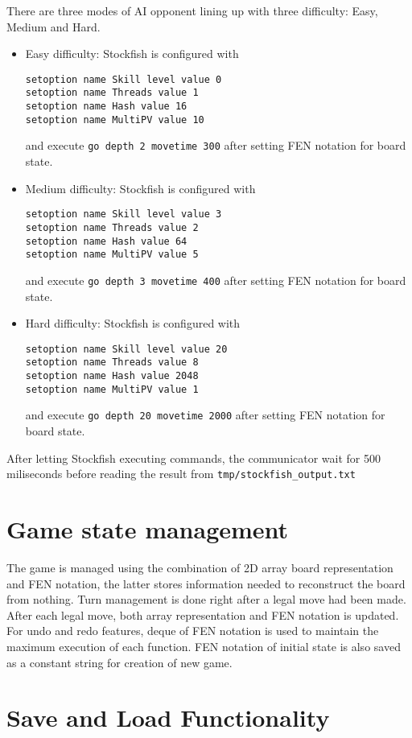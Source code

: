 \documentclass[a4paper, 10pt, titlepage]{report}
\begin{document}
There are three modes of AI opponent lining up with three difficulty: Easy, Medium and Hard.
\begin{itemize}
  \item Easy difficulty: Stockfish is configured with \begin{verbatim}
setoption name Skill level value 0
setoption name Threads value 1     
setoption name Hash value 16      
setoption name MultiPV value 10    
\end{verbatim} and execute \texttt{go depth 2 movetime 300} after setting FEN notation for board state.
  \item Medium difficulty: Stockfish is configured with \begin{verbatim}
setoption name Skill level value 3
setoption name Threads value 2     
setoption name Hash value 64      
setoption name MultiPV value 5    
\end{verbatim} and execute \texttt{go depth 3 movetime 400} after setting FEN notation for board state.
  \item Hard difficulty: Stockfish is configured with \begin{verbatim}
setoption name Skill level value 20
setoption name Threads value 8     
setoption name Hash value 2048      
setoption name MultiPV value 1    
\end{verbatim} and execute \texttt{go depth 20 movetime 2000} after setting FEN notation for board state.
\end{itemize}
After letting Stockfish executing commands, the communicator wait for 500 miliseconds before reading the result from \texttt{tmp/stockfish\_output.txt}
\section{Game state management}
The game is managed using the combination of 2D array board representation and FEN notation, the latter stores information needed to reconstruct the board from nothing. Turn management is done right after a legal move had been made. After each legal move, both array representation and FEN notation is updated. For undo and redo features, deque of FEN notation is used to maintain the maximum execution of each function. FEN notation of initial state is also saved as a constant string for creation of new game.

\section{Save and Load Functionality}
\end{document}
